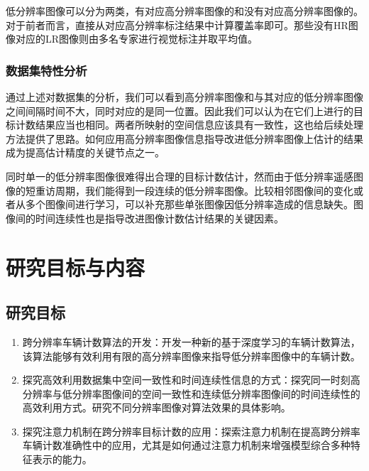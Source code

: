     



低分辨率图像可以分为两类，有对应高分辨率图像的和没有对应高分辨率图像的。对于前者而言，直接从对应高分辨率标注结果中计算覆盖率即可。那些没有HR图像对应的LR图像则由多名专家进行视觉标注并取平均值。


\subsubsection{数据集特性分析}  
通过上述对数据集的分析，我们可以看到高分辨率图像和与其对应的低分辨率图像之间间隔时间不大，同时对应的是同一位置。因此我们可以认为在它们上进行的目标计数结果应当也相同。两者所映射的空间信息应该具有一致性，这也给后续处理方法提供了思路。如何应用高分辨率图像信息指导改进低分辨率图像上估计的结果成为提高估计精度的关键节点之一。

同时单一的低分辨率图像很难得出合理的目标计数估计，然而由于低分辨率遥感图像的短重访周期，我们能得到一段连续的低分辨率图像。比较相邻图像间的变化或者从多个图像间进行学习，可以补充那些单张图像因低分辨率造成的信息缺失。图像间的时间连续性也是指导改进图像计数估计结果的关键因素。

\section{研究目标与内容}
\subsection{研究目标}
\begin{enumerate}    
    \item 跨分辨率车辆计数算法的开发：开发一种新的基于深度学习的车辆计数算法，该算法能够有效利用有限的高分辨率图像来指导低分辨率图像中的车辆计数。
    \item 探究高效利用数据集中空间一致性和时间连续性信息的方式：探究同一时刻高分辨率与低分辨率图像间的空间一致性和连续低分辨率图像间的时间连续性的高效利用方式。研究不同分辨率图像对算法效果的具体影响。
    \item 探究注意力机制在跨分辨率目标计数的应用：探索注意力机制在提高跨分辨率车辆计数准确性中的应用，尤其是如何通过注意力机制来增强模型综合多种特征表示的能力。
\end{enumerate}

